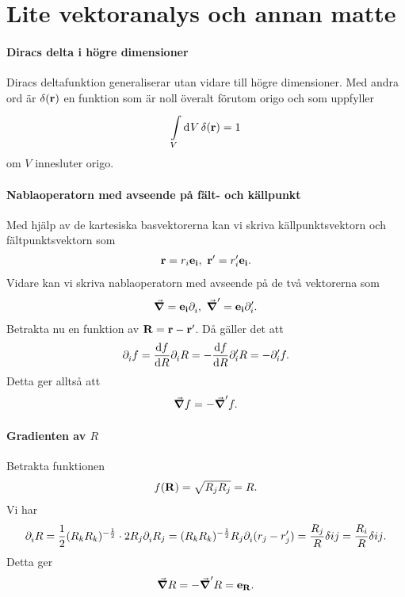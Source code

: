 \section{Lite vektoranalys och annan matte}

\paragraph{Diracs delta i högre dimensioner}
Diracs deltafunktion generaliserar utan vidare till högre dimensioner. Med andra ord är $\delta(\vb{r})$ en funktion som är noll överalt förutom origo och som uppfyller
\begin{align*}
	\int\limits_{V}^{}\dd[]{V}\delta(\vb{r}) = 1
\end{align*}
om $V$ innesluter origo.

\paragraph{Nablaoperatorn med avseende på fält- och källpunkt}
Med hjälp av de kartesiska basvektorerna kan vi skriva källpunktsvektorn och fältpunktsvektorn som
\begin{align*}
	\vb{r} = r_{i}\vb{e}_{\vb{i}},\ \vb{r}' = r_{i}'\vb{e}_{\vb{i}}.
\end{align*}
Vidare kan vi skriva nablaoperatorn med avseende på de två vektorerna som
\begin{align*}
	\grad{} = \vb{e}_{\vb{i}}\partial_{i}^{},\ \grad^{\prime}{} = \vb{e}_{\vb{i}}\partial_{i}^{\prime}.
\end{align*}
Betrakta nu en funktion av $\vb{R} = \vb{r} - \vb{r}'$. Då gäller det att
\begin{align*}
	\partial_{i}^{}f = \dv{f}{R}\partial_{i}^{}R = -\dv{f}{R}\partial_{i}^{\prime}R = -\partial_{i}^{\prime}f.
\end{align*}
Detta ger alltså att
\begin{align*}
	\grad{f} = -\grad^{\prime}{f}.
\end{align*}

\paragraph{Gradienten av $R$}
Betrakta funktionen
\begin{align*}
	f(\vb{R}) = \sqrt{R_{j}R_{j}} = R.
\end{align*}
Vi har
\begin{align*}
	\partial_{i}^{}R = \frac{1}{2}(R_{k}R_{k})^{-\frac{1}{2}}\cdot 2R_{j}\partial_{i}^{}R_{j} = (R_{k}R_{k})^{-\frac{1}{2}}R_{j}\partial_{i}^{}(r_{j} - r_{j}') = \frac{R_{j}}{R}\delta{ij} = \frac{R_{i}}{R}\delta{ij}.
\end{align*}
Detta ger
\begin{align*}
	\grad{R} = -\grad^{\prime}{R} = \vb{e}_{\vb{\vb{R}}}.
\end{align*}

